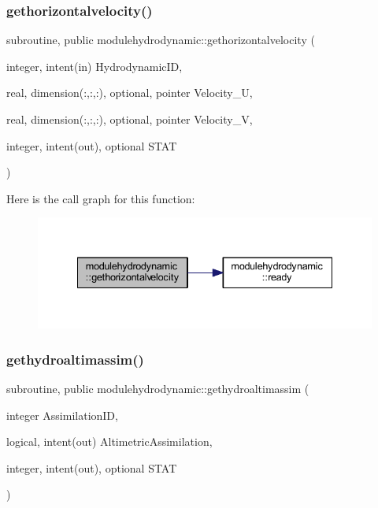 \subsubsection{\texorpdfstring{gethorizontalvelocity()}{gethorizontalvelocity()}}
{\footnotesize\ttfamily subroutine, public modulehydrodynamic\+::gethorizontalvelocity (\begin{DoxyParamCaption}\item[{integer, intent(in)}]{Hydrodynamic\+ID,  }\item[{real, dimension(\+:,\+:,\+:), optional, pointer}]{Velocity\+\_\+U,  }\item[{real, dimension(\+:,\+:,\+:), optional, pointer}]{Velocity\+\_\+V,  }\item[{integer, intent(out), optional}]{S\+T\+AT }\end{DoxyParamCaption})}

Here is the call graph for this function\+:\nopagebreak
\begin{figure}[H]
\begin{center}
\leavevmode
\includegraphics[width=335pt]{namespacemodulehydrodynamic_aba7eae61c437ef648710efabc4d39e36_cgraph}
\end{center}
\end{figure}
\mbox{\label{namespacemodulehydrodynamic_a4d4e017a80d72328f2cdd7b71420fbf3}} 
\subsubsection{\texorpdfstring{gethydroaltimassim()}{gethydroaltimassim()}}
{\footnotesize\ttfamily subroutine, public modulehydrodynamic\+::gethydroaltimassim (\begin{DoxyParamCaption}\item[{integer}]{Assimilation\+ID,  }\item[{logical, intent(out)}]{Altimetric\+Assimilation,  }\item[{integer, intent(out), optional}]{S\+T\+AT }\end{DoxyParamCaption})}


